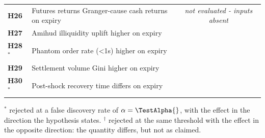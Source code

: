 \documentclass[11pt,a4paper]{article}
\begin{document}
\begin{longtable}{p{0.7cm} p{5.4cm} r r r r}
\textbf{H26} & Futures returns Granger-cause cash returns on expiry & \multicolumn{4}{c}{\textit{not evaluated - inputs absent}} \\
\textbf{H27} & Amihud illiquidity uplift higher on expiry & \HHTwoSevenNPairs{} & \HHTwoSevenTestStat{} & \HHTwoSevenPValue{} & \HHTwoSevenEffectSizeCohenD{} \\
\textbf{H28}$^{\ast}$ & Phantom order rate (<1s) higher on expiry & \HHTwoEightNPairs{} & \HHTwoEightTestStat{} & \HHTwoEightPValue{} & \HHTwoEightEffectSizeCohenD{} \\
\textbf{H29} & Settlement volume Gini higher on expiry & \HHTwoNineNPairs{} & \HHTwoNineTestStat{} & \HHTwoNinePValue{} & \HHTwoNineEffectSizeCohenD{} \\
\textbf{H30}$^{\ast}$ & Post-shock recovery time differs on expiry & \HHThreeZeroNPairs{} & \HHThreeZeroTestStat{} & \HHThreeZeroPValue{} & \HHThreeZeroEffectSizeCohenD{} \\
\end{longtable}
\noindent\footnotesize $^{\ast}$ rejected at a false discovery rate of $\alpha = \TestAlpha{}$, with the effect in the direction the hypothesis states. $^{\dagger}$ rejected at the same threshold with the effect in the opposite direction: the quantity differs, but not as claimed.\normalsize
\end{document}
